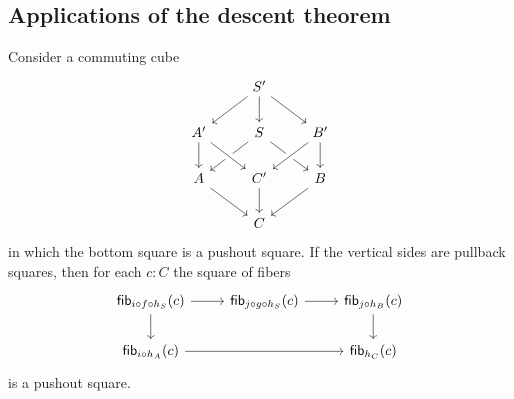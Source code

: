 \subsection{Applications of the descent theorem}

\begin{thm}
  Consider a commuting cube
  \begin{equation*}
    \begin{tikzcd}
      & S' \arrow[dl] \arrow[dr] \arrow[d] \\
      A' \arrow[d] & S \arrow[dl] \arrow[dr] & B' \arrow[dl,crossing over] \arrow[d] \\
      A \arrow[dr] & C' \arrow[from=ul,crossing over] \arrow[d] & B \arrow[dl] \\
      & C
    \end{tikzcd}
  \end{equation*}
  in which the bottom square is a pushout square. If the vertical sides are pullback squares, then for each $c:C$ the square of fibers
  \begin{equation*}
    \begin{tikzcd}
      \fib{i\circ f\circ h_S}{c} \arrow[d] \arrow[r] & \fib{j\circ g\circ h_S}{c} \arrow[r] & \fib{j\circ h_B}{c} \arrow[d] \\
      \fib{i\circ h_A}{c} \arrow[rr] & & \fib{h_C}{c}
    \end{tikzcd}
  \end{equation*}
  is a pushout square.
\end{thm}

